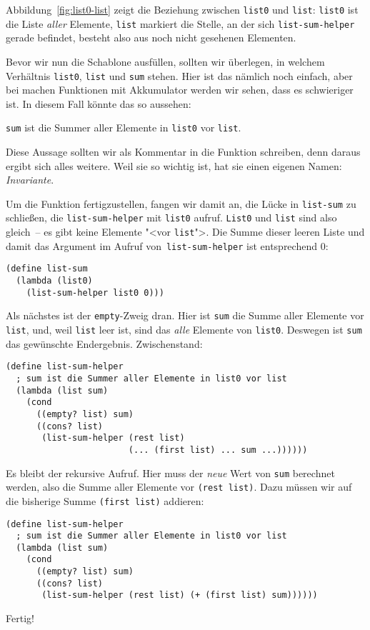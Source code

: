 Abbildung~\ref{fig:list0-list} zeigt die Beziehung zwischen
\lstinline{list0} und \lstinline{list}: \lstinline{list0} ist die
Liste \emph{aller} Elemente, \lstinline{list} markiert die Stelle, an
der sich \lstinline{list-sum-helper} gerade befindet, besteht also aus
noch nicht gesehenen Elementen.

Bevor wir nun die Schablone ausfüllen, sollten wir überlegen, in welchem Verhältnis
\lstinline{list0}, \lstinline{list} und \lstinline{sum} stehen.  Hier
ist das nämlich noch einfach, aber bei machen Funktionen mit
Akkumulator werden wir sehen, dass es schwieriger ist.  In diesem Fall
könnte das so aussehen:
%
\begin{center}
  \lstinline{sum} ist die Summer aller Elemente in \lstinline{list0} vor
  \lstinline{list}.
\end{center}
%
Diese Aussage sollten wir als Kommentar in die Funktion schreiben,
denn daraus ergibt sich alles weitere.  Weil sie so wichtig ist, hat
sie einen eigenen Namen: \textit{Invariante}.

Um die Funktion fertigzustellen, fangen wir damit an, die Lücke in
\lstinline{list-sum} zu schließen, die \lstinline{list-sum-helper} mit
\lstinline{list0} aufruf.  \lstinline{List0} und \lstinline{list} sind
also gleich~-- es gibt keine Elemente "<vor \lstinline{list}">.  Die
Summe dieser leeren Liste und damit das Argument im Aufruf
von \lstinline{list-sum-helper} ist entsprechend 0:
%
\begin{lstlisting}
(define list-sum
  (lambda (list0)
    (list-sum-helper list0 0)))
\end{lstlisting}
%
Als nächstes ist der \lstinline{empty}-Zweig dran.  Hier ist
\lstinline{sum} die Summe aller Elemente vor \lstinline{list}, und,
weil \lstinline{list} leer ist, sind das \emph{alle} Elemente von
\lstinline{list0}.  Deswegen ist \lstinline{sum} das gewünschte
Endergebnis.  Zwischenstand:
%
\begin{lstlisting}
(define list-sum-helper
  ; sum ist die Summer aller Elemente in list0 vor list
  (lambda (list sum)
    (cond
      ((empty? list) sum)
      ((cons? list)
       (list-sum-helper (rest list)
                        (... (first list) ... sum ...))))))
\end{lstlisting}
%
Es bleibt der rekursive Aufruf.  Hier muss der \emph{neue} Wert von
\lstinline{sum} berechnet werden, also die Summe aller Elemente vor
\lstinline{(rest list)}.  Dazu müssen wir auf die bisherige Summe
\lstinline{(first list)} addieren:
%
\begin{lstlisting}
(define list-sum-helper
  ; sum ist die Summer aller Elemente in list0 vor list
  (lambda (list sum)
    (cond
      ((empty? list) sum)
      ((cons? list)
       (list-sum-helper (rest list) (+ (first list) sum))))))
\end{lstlisting}
%
Fertig!

